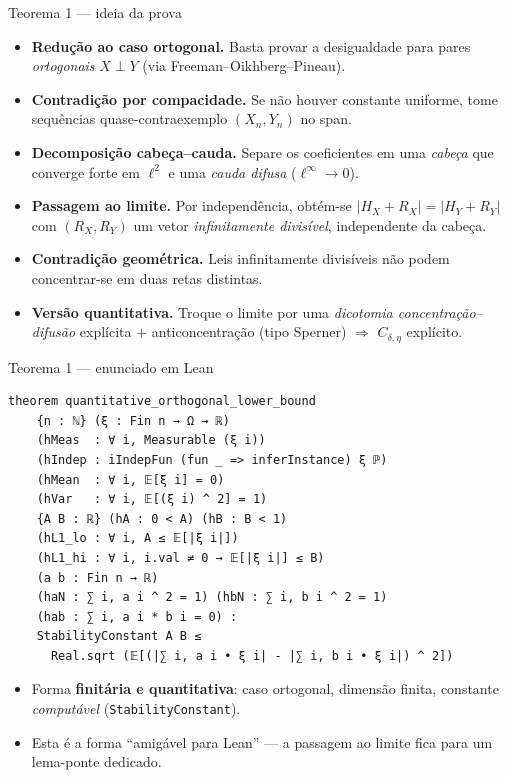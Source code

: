 \documentclass[10pt,aspectratio=169]{beamer}
\newcommand{\abs}[1]{\left|#1\right|}
\newcommand{\hl}[1]{{\color{accent}\textbf{#1}}}
\newcommand{\hlo}[1]{{\color{accent3}\textbf{#1}}}
\begin{document}
\begin{frame}{Teorema 1 --- ideia da prova}
  \begin{itemize}\small
    \setlength{\itemsep}{0.55em}
    \item \hl{Redução ao caso ortogonal.} Basta provar a desigualdade
          para pares \emph{ortogonais} $X\perp Y$
          (via Freeman--Oikhberg--Pineau).
    \pause
    \item \hl{Contradição por compacidade.} Se não houver constante
          uniforme, tome sequências quase-contraexemplo
          $(X_n,Y_n)$ no span.
    \pause
    \item \hl{Decomposição cabeça--cauda.} Separe os coeficientes em
          uma \emph{cabeça} que converge forte em $\ell^2$ e uma
          \emph{cauda difusa} ($\ell^\infty\to0$).
    \pause
    \item \hl{Passagem ao limite.} Por independência, obtém-se
          $\abs{H_X+R_X}=\abs{H_Y+R_Y}$ com $(R_X,R_Y)$ um vetor
          \emph{infinitamente divisível}, independente da cabeça.
    \pause
    \item \hl{Contradição geométrica.} Leis infinitamente divisíveis
          não podem concentrar-se em duas retas distintas.
    \pause
    \item \hlo{Versão quantitativa.} Troque o limite por uma
          \emph{dicotomia concentração--difusão} explícita $+$
          anticoncentração (tipo Sperner) $\Rightarrow$
          $C_{\delta,\eta}$ explícito.
  \end{itemize}
\end{frame}

\begin{frame}[fragile]{Teorema 1 --- enunciado em Lean}
  \vspace{-0.3em}
\begin{lstlisting}
theorem quantitative_orthogonal_lower_bound
    {n : ℕ} (ξ : Fin n → Ω → ℝ)
    (hMeas  : ∀ i, Measurable (ξ i))
    (hIndep : iIndepFun (fun _ => inferInstance) ξ ℙ)
    (hMean  : ∀ i, 𝔼[ξ i] = 0)
    (hVar   : ∀ i, 𝔼[(ξ i) ^ 2] = 1)
    {A B : ℝ} (hA : 0 < A) (hB : B < 1)
    (hL1_lo : ∀ i, A ≤ 𝔼[|ξ i|])
    (hL1_hi : ∀ i, i.val ≠ 0 → 𝔼[|ξ i|] ≤ B)
    (a b : Fin n → ℝ)
    (haN : ∑ i, a i ^ 2 = 1) (hbN : ∑ i, b i ^ 2 = 1)
    (hab : ∑ i, a i * b i = 0) :
    StabilityConstant A B ≤
      Real.sqrt (𝔼[(|∑ i, a i • ξ i| - |∑ i, b i • ξ i|) ^ 2])
\end{lstlisting}
  \vspace{-0.3em}
  \pause
  \begin{itemize}\small
    \item Forma \hl{finitária e quantitativa}: caso ortogonal,
          dimensão finita, constante \emph{computável}
          (\texttt{StabilityConstant}).
    \item Esta é a forma ``amigável para Lean'' --- a passagem ao
          limite fica para um lema-ponte dedicado.
  \end{itemize}
\end{frame}
\end{document}
